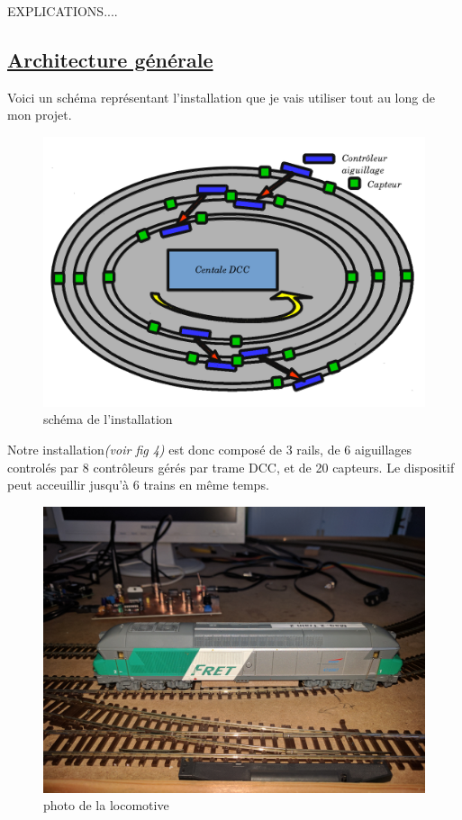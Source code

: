 EXPLICATIONS....

\newpage

\subsection{\underline{ Architecture g\'en\'erale}}
\label{sec:archi}

  Voici un sch\'ema repr\'esentant l'installation que je vais
utiliser tout au long de mon projet.


\begin{figure}[ht]
\centering
\includegraphics[scale=0.30]{schema.png}
\caption{sch\'ema de l'installation}
\label{fig4}
\end{figure}

  Notre installation\emph{(voir fig 4)} est donc compos\'e de 3 rails, de 6 aiguillages
control\'es par 8 contr\^oleurs gérés par trame DCC, et de 20 capteurs.
Le dispositif peut acceuillir jusqu'\`a 6 trains en m\^eme temps.

\begin{figure}[ht]
\centering
\includegraphics[scale=0.05]{loco.jpg}
\caption{photo de la locomotive}
\label{fig5}
\end{figure}

